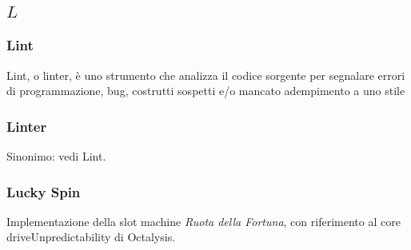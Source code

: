 \subsection*{\quad$L\quad$}
\subsubsection*{Lint}
Lint, o linter, è uno strumento che analizza il codice sorgente per segnalare errori di programmazione, bug, costrutti sospetti e/o mancato adempimento a uno stile
\subsubsection*{Linter}
Sinonimo: vedi Lint\glo.

\subsubsection*{Lucky Spin}
Implementazione della slot machine \textit{Ruota della Fortuna}, con riferimento al core drive\glosp Unpredictability di Octalysis\glo.